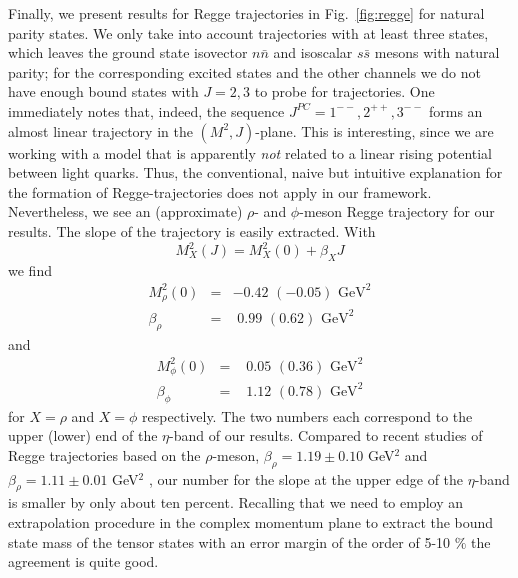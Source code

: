 Finally, we present results for Regge trajectories in Fig.~\ref{fig:regge} for natural parity states. 
We only take into 
account trajectories with at least three states, which leaves the ground state isovector $n\bar{n}$ 
and isoscalar $s\bar{s}$ mesons with natural parity; for the corresponding excited states and the 
other channels we do not have enough bound states with $J=2,3$ to probe for trajectories. 
One immediately notes that, indeed, the sequence $J^{PC}=1^{--}, 2^{++}, 3^{--}$ forms an almost linear
trajectory in the $(M^2,J)$-plane. 
This is interesting, since we are working with a model that is
apparently \emph{not} related to a linear rising potential between light quarks. 
%
Thus, the 
conventional, naive but intuitive explanation for the formation of Regge-trajectories does not apply
in our framework. Nevertheless, we see an (approximate) $\rho$- and $\phi$-meson Regge trajectory 
for our results. The slope of the trajectory is easily extracted. With
\begin{equation}
M^2_X(J) = M^2_X(0) + \beta_X J
\end{equation} 
we find
\begin{eqnarray}
M^2_\rho(0) &=& -0.42 \,\,(-0.05)\,\, \mbox{GeV}^2 \nonumber\\
\beta_\rho &=& \,\,0.99 \,\,(0.62)\,\, \mbox{GeV}^2 \nonumber
\end{eqnarray}
and 
\begin{eqnarray}
M^2_\phi(0) &=& \,\,0.05 \,\,(0.36)\,\, \mbox{GeV}^2 \nonumber\\
 \beta_\phi &=& \,\,1.12 \,\,(0.78)\,\, \mbox{GeV}^2 \nonumber
\end{eqnarray}
for $X=\rho$ and $X=\phi$ respectively. The two numbers each correspond to the upper (lower)
end of the $\eta$-band of our results. Compared to recent studies of Regge trajectories
based on the $\rho$-meson, $\beta_\rho = 1.19 \pm 0.10$ GeV$^2$ \cite{Masjuan:2012gc} and 
$\beta_\rho = 1.11 \pm 0.01$ GeV$^2$ \cite{Londergan:2013dza}, our number for the slope at the
upper edge of the $\eta$-band is smaller by only about 
ten percent. Recalling that we need to employ an extrapolation procedure in the complex 
momentum plane to extract the bound state mass of the tensor states with an error margin 
of the order of 5-10 $\%$ the agreement is quite good.

